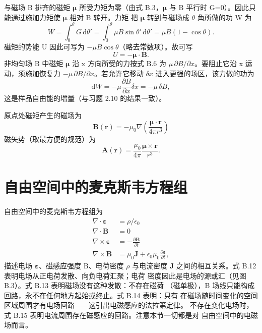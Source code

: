 与磁场 B 排齐的磁矩 $\boldsymbol{\mu}$ 所受力矩为零（由式 B.3，$\boldsymbol{\mu}$
与 B 平行时 G=0）。因此只能通过施加力矩使 $\boldsymbol{\mu}$ 相对 B 转开。力矩
把 $\boldsymbol{\mu}$ 转到与磁场成 $\theta$ 角所做的功 W 为
\begin{equation*}
W = \int_{0}^{\theta}G\,\mathrm{d}\theta' = \int_{0}^{\theta}\mu B\sin\theta'\,\mathrm{d}\theta' = \mu B(1-\cos\theta).\tag{B.7}
\end{equation*}
磁矩的势能 U 因此可写为 $-\mu B\cos\theta$（略去常数项）。故可写
\begin{equation*}
U = -\boldsymbol{\mu}\cdot\mathbf{B}.\tag{B.8}
\end{equation*}
非均匀场 B 中磁矩 $\boldsymbol{\mu}$ 沿 x 方向所受的力按式 B.6 为
$\mu\,\partial B/\partial x$。要阻止它沿 x 运动，须施加恢复力
$-\mu\,\partial B/\partial x$。若允许它移动 $\delta x$ 进入更强的场区，该力做的功为
\begin{equation*}
\mathrm{d}W = -\mu\frac{\partial B}{\partial x}\delta x = -\mu\,\delta B,\tag{B.9}
\end{equation*}
这是样品自由能的增量（与习题 2.10 的结果一致）。

原点处磁矩产生的磁场为
\begin{equation*}
\mathbf{B}(\mathbf{r}) = -\mu_0\nabla\left(\frac{\boldsymbol{\mu}\cdot\mathbf{r}}{4\pi r^{3}}\right)\tag{B.10}
\end{equation*}
磁矢势（取最方便的规范）为
\begin{equation*}
\mathbf{A}(\mathbf{r}) = \frac{\mu_0}{4\pi}\frac{\boldsymbol{\mu}\times\mathbf{r}}{r^{3}}.\tag{B.11}
\end{equation*}

\section{自由空间中的麦克斯韦方程组}

自由空间中的麦克斯韦方程组为
\begin{align*}
\nabla\cdot\boldsymbol{\varepsilon} &= \rho/\epsilon_0\tag{B.12}\\
\nabla\cdot\mathbf{B} &= 0\tag{B.13}\\
\nabla\times\boldsymbol{\varepsilon} &= -\frac{\partial\mathbf{B}}{\partial t}\tag{B.14}\\
\nabla\times\mathbf{B} &= \mu_0\mathbf{J} + \epsilon_0\mu_0\frac{\partial\boldsymbol{\varepsilon}}{\partial t},\tag{B.15}
\end{align*}
描述电场 $\boldsymbol{\varepsilon}$、磁感应强度 B、电荷密度 $\rho$ 与电流密度
$\mathbf{J}$ 之间的相互关系。式 B.12 表明电场从正电荷发散、向负电荷汇聚；电荷
密度因此是电场的源或汇（见图 B.3）。式 B.13 表明磁场没有这种发散：不存在磁荷
（磁单极），B 场线只能构成回路，永不在任何地方起始或终止。式 B.14 表明：只有
在磁场随时间变化的空间区域周围才有电场回路——这引出电磁感应的法拉第定律。
不存在变化电场时，式 B.15 表明电流周围存在磁感应的回路。注意本节一切都是对
自由空间中的电磁场而言。

